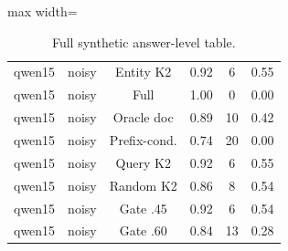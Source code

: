 \begin{table}[t]
\begin{adjustbox}{max width=\textwidth}
\begin{tabular}{cccccc}
qwen15 & noisy & Entity K2 & 0.92 & 6 & 0.55 \\
qwen15 & noisy & Full & 1.00 & 0 & 0.00 \\
qwen15 & noisy & Oracle doc & 0.89 & 10 & 0.42 \\
qwen15 & noisy & Prefix-cond. & 0.74 & 20 & 0.00 \\
qwen15 & noisy & Query K2 & 0.92 & 6 & 0.55 \\
qwen15 & noisy & Random K2 & 0.86 & 8 & 0.54 \\
qwen15 & noisy & Gate .45 & 0.92 & 6 & 0.54 \\
qwen15 & noisy & Gate .60 & 0.84 & 13 & 0.28 \\
\bottomrule
\end{tabular}
\end{adjustbox}
\caption{Full synthetic answer-level table.}
\label{tab:app-synthetic}
\end{table}
